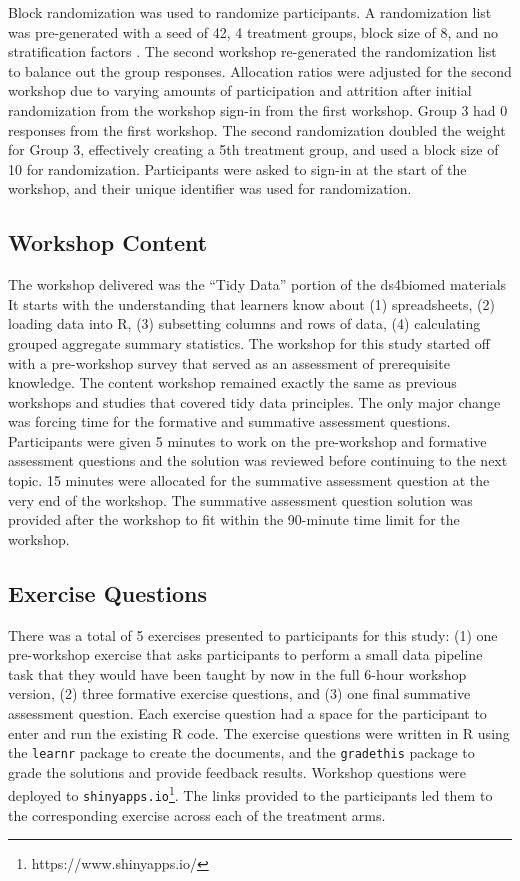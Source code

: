 \documentclass[acmsmall]{acmart}
\newcommand{\code}[1]{\lstinline{#1}}
\begin{document}
Block randomization was used to randomize participants.
A randomization list was pre-generated with a
seed of 42, 4 treatment groups, block size of 8, and no stratification factors
\cite{sealedenvelopeltdCreateBlockedRandomisation2021}.
The second workshop re-generated the randomization list to balance out the group responses.
Allocation ratios were adjusted for the second workshop due to varying amounts of participation
and attrition after initial randomization from the workshop sign-in from the first workshop.
Group 3 had 0 responses from the first workshop.
The second randomization doubled the weight for Group 3,
effectively creating a 5th treatment group, and used a block size of 10 for randomization.
Participants were asked to sign-in at the start of the workshop,
and their unique identifier was used for randomization.

\subsection{Workshop Content}

The workshop delivered was  the ``Tidy Data'' portion of the ds4biomed materials %
It starts with the understanding that learners know about
(1) spreadsheets,
(2) loading data into R,
(3) subsetting columns and rows of data,
(4) calculating grouped aggregate summary statistics.
The workshop for this study started off with a pre-workshop survey that served as an assessment of
prerequisite knowledge.
The content workshop remained exactly the same as previous workshops and studies
that covered tidy data principles.
The only major change was forcing time for the formative and summative assessment questions.
Participants were given 5 minutes to work on the pre-workshop and formative assessment questions
and the solution was reviewed before continuing to the next topic.
15 minutes were allocated for the summative assessment question at the very end of the workshop.
The summative assessment question solution was provided after the workshop to fit within the
90-minute time limit for the workshop.

\subsection{Exercise Questions}

There was a total of 5 exercises presented to participants for this study:
(1) one pre-workshop exercise that asks participants to perform a small data pipeline task that they would
have been taught by now in the full 6-hour workshop version,
(2) three formative exercise questions, and
(3) one final summative assessment question.
Each exercise question had a space for the participant to enter and run the existing R code.
The exercise questions were written in R using the \code{learnr} package to create the documents,
and the \code{gradethis} package to grade the solutions and provide feedback results.
Workshop questions were deployed to \code{shinyapps.io}\footnote{https://www.shinyapps.io/}.
The links provided to the participants led them to the corresponding exercise across each of the treatment arms.
\end{document}
